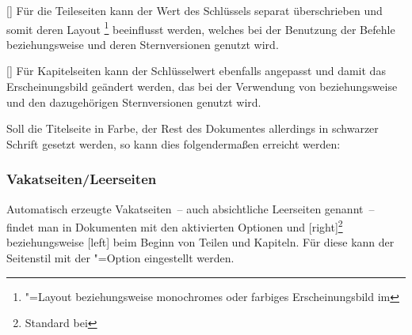 \begin{Declaration}{[\PSet]}
\printdeclarationlist%
%
%
Für die Teileseiten kann der Wert des Schlüssels  separat 
überschrieben und somit deren Layout%
\footnote{\label{fn:layout}%
  \KOMAScript"=Layout beziehungsweise monochromes oder farbiges 
  Erscheinungsbild im \CD%
}
beeinflusst werden, welches bei der Benutzung der Befehle  
beziehungsweise  und deren Sternversionen genutzt wird.
\end{Declaration}

\begin{Declaration}{[\PSet]}
\printdeclarationlist%
%
%
Für Kapitelseiten kann der Schlüsselwert  ebenfalls angepasst und 
damit das Erscheinungsbild geändert werden, das bei der 
Verwendung von  beziehungsweise  und den 
dazugehörigen Sternversionen genutzt wird.
\end{Declaration}
%
\begin{Example}
Soll die Titelseite in Farbe, der Rest des Dokumentes allerdings in schwarzer 
Schrift gesetzt werden, so kann dies folgendermaßen erreicht werden:
\end{Example}

\subsubsection{Vakatseiten/Leerseiten}
%
Automatisch erzeugte Vakatseiten~-- auch absichtliche Leerseiten genannt~-- 
findet man in Dokumenten mit den aktivierten Optionen  und 
[right]\footnote{Standard bei } beziehungsweise 
[left] beim Beginn von Teilen und Kapiteln. Für diese kann der 
Seitenstil mit der \KOMAScript"=Option  eingestellt 
werden.

